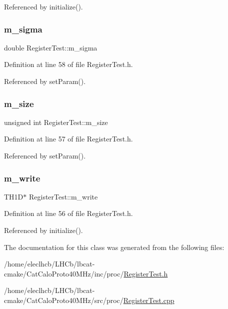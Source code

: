 Referenced by initialize().

\mbox{\label{classRegisterTest_a17f1f3646bf00ae7ab6744afca9e6813}} 
\subsubsection{\texorpdfstring{m\+\_\+sigma}{m\_sigma}}
{\footnotesize\ttfamily double Register\+Test\+::m\+\_\+sigma\hspace{0.3cm}{\ttfamily [private]}}



Definition at line 58 of file Register\+Test.\+h.



Referenced by set\+Param().

\mbox{\label{classRegisterTest_ab543b709d593b4ae36c628c60da76923}} 
\subsubsection{\texorpdfstring{m\+\_\+size}{m\_size}}
{\footnotesize\ttfamily unsigned int Register\+Test\+::m\+\_\+size\hspace{0.3cm}{\ttfamily [private]}}



Definition at line 57 of file Register\+Test.\+h.



Referenced by set\+Param().

\mbox{\label{classRegisterTest_a4e2dbc640871ece43a554425e2b73dcf}} 
\subsubsection{\texorpdfstring{m\+\_\+write}{m\_write}}
{\footnotesize\ttfamily T\+H1D$\ast$ Register\+Test\+::m\+\_\+write\hspace{0.3cm}{\ttfamily [private]}}



Definition at line 56 of file Register\+Test.\+h.



Referenced by initialize().



The documentation for this class was generated from the following files\+:\begin{DoxyCompactItemize}
\item 
/home/eleclhcb/\+L\+H\+Cb/lbcat-\/cmake/\+Cat\+Calo\+Proto40\+M\+Hz/inc/proc/\hyperlink{RegisterTest_8h}{Register\+Test.\+h}\item 
/home/eleclhcb/\+L\+H\+Cb/lbcat-\/cmake/\+Cat\+Calo\+Proto40\+M\+Hz/src/proc/\hyperlink{RegisterTest_8cpp}{Register\+Test.\+cpp}\end{DoxyCompactItemize}
